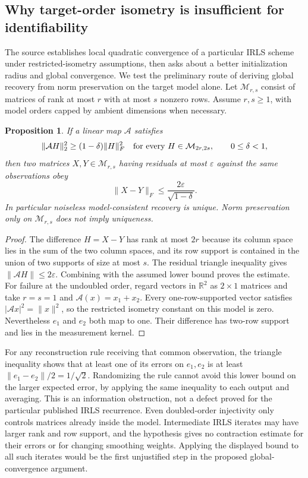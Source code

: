 \documentclass[11pt]{article}
\newtheorem{proposition}{Proposition}
\begin{document}
\subsection{Why target-order isometry is insufficient for identifiability}
The source establishes local quadratic convergence of a particular IRLS scheme under restricted-isometry assumptions, then asks about a better initialization radius and global convergence. We test the preliminary route of deriving global recovery from norm preservation on the target model alone. Let $\mathcal M_{r,s}$ consist of matrices of rank at most $r$ with at most $s$ nonzero rows. Assume $r,s\ge1$, with model orders capped by ambient dimensions when necessary.
\begin{proposition}
If a linear map $\mathcal A$ satisfies
\[
\|\mathcal A H\|_2^2\ge(1-\delta)\|H\|_F^2
\quad\hbox{for every }H\in\mathcal M_{2r,2s},\qquad0\le\delta<1,
\]
then two matrices $X,Y\in\mathcal M_{r,s}$ having residuals at most $\varepsilon$ against the same observations obey
\[
\|X-Y\|_F\le\frac{2\varepsilon}{\sqrt{1-\delta}}.
\]
In particular noiseless model-consistent recovery is unique. Norm preservation only on $\mathcal M_{r,s}$ does not imply uniqueness.
\end{proposition}
\begin{proof}
The difference $H=X-Y$ has rank at most $2r$ because its column space lies in the sum of the two column spaces, and its row support is contained in the union of two supports of size at most $s$. The residual triangle inequality gives $\|\mathcal AH\|\le2\varepsilon$. Combining with the assumed lower bound proves the estimate.
For failure at the undoubled order, regard vectors in $\mathbb R^2$ as $2\times1$ matrices and take $r=s=1$ and $\mathcal A(x)=x_1+x_2$. Every one-row-supported vector satisfies $|\mathcal Ax|^2=\|x\|^2$, so the restricted isometry constant on this model is zero. Nevertheless $e_1$ and $e_2$ both map to one. Their difference has two-row support and lies in the measurement kernel.
\end{proof}
For any reconstruction rule receiving that common observation, the triangle inequality shows that at least one of its errors on $e_1,e_2$ is at least $\|e_1-e_2\|/2=1/\sqrt2$. Randomizing the rule cannot avoid this lower bound on the larger expected error, by applying the same inequality to each output and averaging. This is an information obstruction, not a defect proved for the particular published IRLS recurrence.
Even doubled-order injectivity only controls matrices already inside the model. Intermediate IRLS iterates may have larger rank and row support, and the hypothesis gives no contraction estimate for their errors or for changing smoothing weights. Applying the displayed bound to all such iterates would be the first unjustified step in the proposed global-convergence argument.
\end{document}
